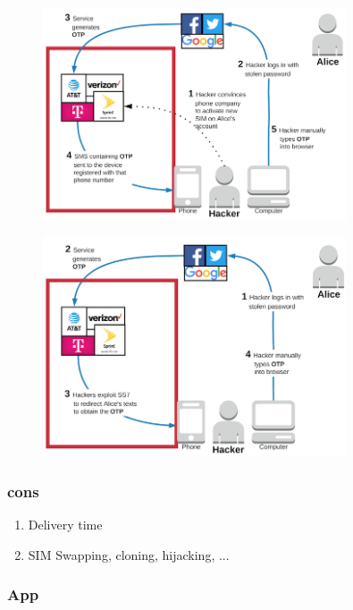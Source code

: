 \begin{figure}[hbt]
  \centering
\includegraphics[width=0.8\textwidth]{pics/04---social-engineering-3.png}
  \caption{}
\end{figure}

\begin{figure}[hbt]
  \centering
\includegraphics[width=0.8\textwidth]{pics/05---SS7-2.png}
  \caption{}
\end{figure}

\subsubsection{cons}

\begin{enumerate}
	\item Delivery time
	\item SIM Swapping, cloning, hijacking, ...
\end{enumerate}

\subsubsection{App}

